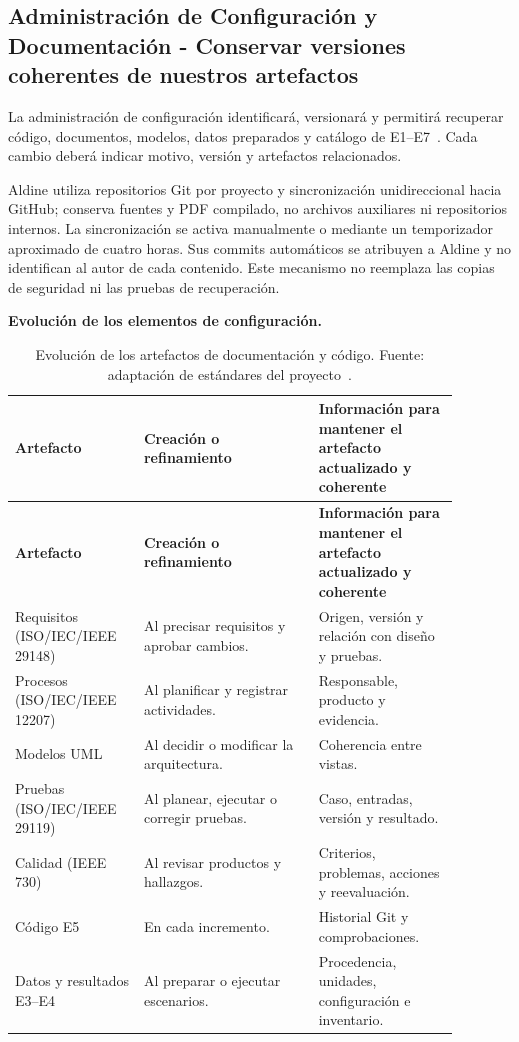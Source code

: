 
\subsection{Administración de Configuración y Documentación - Conservar versiones coherentes de nuestros artefactos}\label{sec:spmp-12-3}

La administración de configuración identificará, versionará y permitirá recuperar código, documentos, modelos, datos preparados y catálogo de E1--E7~\cite{adaptacion2026,std12207}. Cada cambio deberá indicar motivo, versión y artefactos relacionados.

Aldine utiliza repositorios Git por proyecto y sincronización unidireccional hacia GitHub; conserva fuentes y PDF compilado, no archivos auxiliares ni repositorios internos. La sincronización se activa manualmente o mediante un temporizador aproximado de cuatro horas. Sus commits automáticos se atribuyen a Aldine y no identifican al autor de cada contenido. Este mecanismo no reemplaza las copias de seguridad ni las pruebas de recuperación.

\textbf{Evolución de los elementos de configuración.}

\begin{longtable}{|p{0.24\linewidth}|p{0.35\linewidth}|p{0.29\linewidth}|}
\caption{Evolución de los artefactos de documentación y código. Fuente: adaptación de estándares del proyecto~\cite{adaptacion2026}.}\label{tab:artefactos}\\
\hline
\textbf{Artefacto} & \textbf{Creación o refinamiento} & \textbf{Información para mantener el artefacto actualizado y coherente}\\\hline
\endfirsthead
\hline
\textbf{Artefacto} & \textbf{Creación o refinamiento} & \textbf{Información para mantener el artefacto actualizado y coherente}\\\hline
\endhead
Requisitos (ISO/IEC/IEEE 29148) & Al precisar requisitos y aprobar cambios. & Origen, versión y relación con diseño y pruebas.\\\hline
Procesos (ISO/IEC/IEEE 12207) & Al planificar y registrar actividades. & Responsable, producto y evidencia.\\\hline
Modelos UML & Al decidir o modificar la arquitectura. & Coherencia entre vistas.\\\hline
Pruebas (ISO/IEC/IEEE 29119) & Al planear, ejecutar o corregir pruebas. & Caso, entradas, versión y resultado.\\\hline
Calidad (IEEE 730) & Al revisar productos y hallazgos. & Criterios, problemas, acciones y reevaluación.\\\hline
Código E5 & En cada incremento. & Historial Git y comprobaciones.\\\hline
Datos y resultados E3--E4 & Al preparar o ejecutar escenarios. & Procedencia, unidades, configuración e inventario.\\\hline
\end{longtable}

